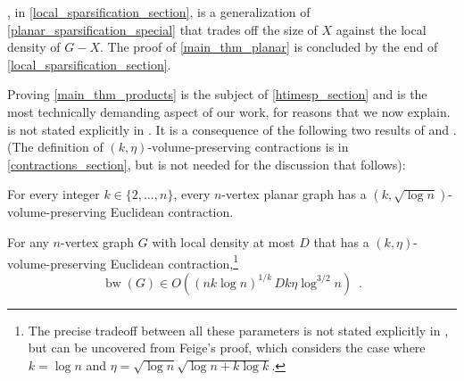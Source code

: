 \documentclass{patmorin}
\newcommand{\david}[1]{{\color{orange} David: #1}}
\newcommand{\pat}[1]{\textcolor{Blue}{Pat: #1}}
\newcommand{\piotr}[1]{\textcolor{red}{Piotr: #1}}
\DeclareMathOperator{\bw}{bw}
\begin{document}
, in \cref{local_sparsification_section}, is a generalization of \cref{planar_sparsification_special} that trades off the size of $X$ against the local density of $G-X$.  The proof of \cref{main_thm_planar} is concluded by the end of \cref{local_sparsification_section}.


%




Proving \cref{main_thm_products} is the subject of \cref{htimesp_section} and is the most technically demanding aspect of our work, for reasons that we now explain.
 is not stated explicitly in \cite{rao:small}.  It is a consequence of the following two results of \citet{feige:approximating} and \citet{rao:small}. (The definition of $(k,\eta)$-volume-preserving contractions is in \cref{contractions_section}, but is not needed for the  discussion that follows):

\begin{thm}\label{rao_planar_graphs}
    For every integer $k\in\{2,\ldots,n\}$, every $n$-vertex planar graph has a $(k,\sqrt{\log n})$-volume-preserving Euclidean contraction.
\end{thm}

\begin{thm}\label{feige_bandwidth_vs_density_graphs}
    For any $n$-vertex graph $G$ with local density at most $D$ that has a $(k,\eta)$-volume-preserving Euclidean contraction,\footnote{The precise tradeoff between all these parameters is not stated explicitly in \cite{feige:approximating}, but can be uncovered from Feige's proof, which considers the case where $k=\log n$ and $\eta=\sqrt{\log n}\sqrt{\log n+ k\log k}$.}
    \[
        \bw(G) \in O((nk\log n)^{1/k}\,Dk\eta\log^{3/2} n) \enspace .
    \]
\end{thm}
\end{document}
